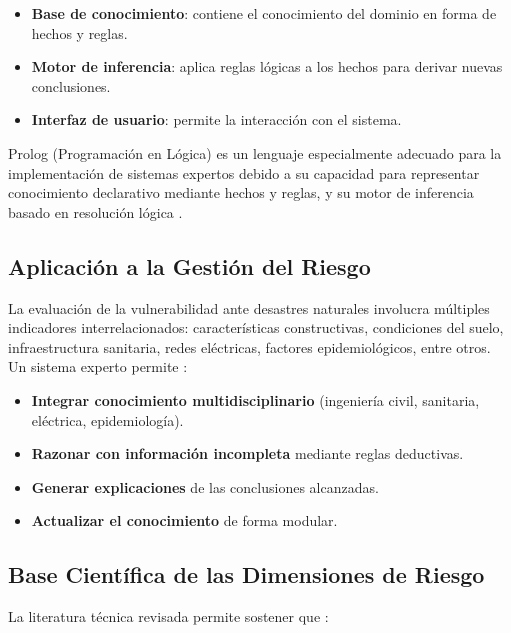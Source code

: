 \documentclass[12pt, letterpaper]{article}
\begin{document}
\begin{itemize}
  \item \textbf{Base de conocimiento}: contiene el conocimiento del dominio en forma de hechos y reglas.
  \item \textbf{Motor de inferencia}: aplica reglas lógicas a los hechos para derivar nuevas conclusiones.
  \item \textbf{Interfaz de usuario}: permite la interacción con el sistema.
\end{itemize}

Prolog (Programación en Lógica) es un lenguaje especialmente adecuado para la implementación de sistemas expertos debido a su capacidad para representar conocimiento declarativo mediante hechos y reglas, y su motor de inferencia basado en resolución lógica \parencite{bratko_2012}.

\subsection{Aplicación a la Gestión del Riesgo}

La evaluación de la vulnerabilidad ante desastres naturales involucra múltiples indicadores interrelacionados: características constructivas, condiciones del suelo, infraestructura sanitaria, redes eléctricas, factores epidemiológicos, entre otros. Un sistema experto permite \parencite{bratko_2012}:

\begin{itemize}
  \item \textbf{Integrar conocimiento multidisciplinario} (ingeniería civil, sanitaria, eléctrica, epidemiología).
  \item \textbf{Razonar con información incompleta} mediante reglas deductivas.
  \item \textbf{Generar explicaciones} de las conclusiones alcanzadas.
  \item \textbf{Actualizar el conocimiento} de forma modular.
\end{itemize}

\subsection{Base Científica de las Dimensiones de Riesgo}

La literatura técnica revisada permite sostener que \parencite{min_vivienda_rne, typsa_drenaje, usat_drenaje, osinergmin_cne, perez_leptospira, minsa_alerta_2023, geresa_sala, cenepred_jornada}:
\end{document}
